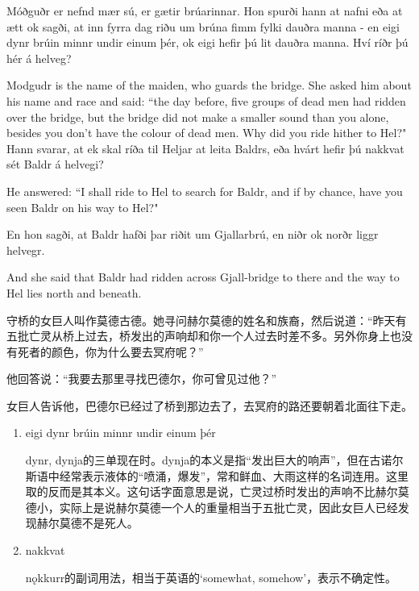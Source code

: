 \begin{paracol}{2}
    Móðguðr er nefnd mær sú, er gætir brúarinnar. Hon spurði hann at nafni eða at ætt ok sagði, at inn fyrra dag riðu um brúna fimm fylki dauðra manna - en eigi dynr brúin minnr undir einum þér, ok eigi hefir þú lit dauðra manna. Hví ríðr þú hér á helveg?
    \switchcolumn

    Modgudr is the name of the maiden, who guards the bridge. She asked him about his name and race and said: ``the day before, five groups of dead men had ridden over the bridge, but the bridge did not make a smaller sound than you alone, besides you don't have the colour of dead men. Why did you ride hither to Hel?"
    \switchcolumn*
    Hann svarar, at ek skal ríða til Heljar at leita Baldrs, eða hvárt hefir þú nakkvat sét Baldr á helvegi?

    \switchcolumn

    He answered: ``I shall ride to Hel to search for Baldr, and if by chance, have you seen Baldr on his way to Hel?"

    \switchcolumn*
    En hon sagði, at Baldr hafði þar riðit um Gjallarbrú, en niðr ok norðr liggr helvegr.

    \switchcolumn
    And she said that Baldr had ridden across Gjall-bridge to there and the way to Hel lies north and beneath.
\end{paracol}
\begin{translation*}{}
    守桥的女巨人叫作莫德古德。她寻问赫尔莫德的姓名和族裔，然后说道：“昨天有五批亡灵从桥上过去，桥发出的声响却和你一个人过去时差不多。另外你身上也没有死者的颜色，你为什么要去冥府呢？”

    他回答说：“我要去那里寻找巴德尔，你可曾见过他？”

    女巨人告诉他，巴德尔已经过了桥到那边去了，去冥府的路还要朝着北面往下走。
\end{translation*}
\begin{grammar*}{}
    \begin{enumerate}[leftmargin=*]
        \item eigi dynr brúin minnr undir einum þér

              dynr, dynja的三单现在时。dynja的本义是指“发出巨大的响声”，但在古诺尔斯语中经常表示液体的“喷涌，爆发”，常和鲜血、大雨这样的名词连用。这里取的反而是其本义。这句话字面意思是说，亡灵过桥时发出的声响不比赫尔莫德小，实际上是说赫尔莫德一个人的重量相当于五批亡灵，因此女巨人已经发现赫尔莫德不是死人。

        \item nakkvat

              nǫkkurr的副词用法，相当于英语的`somewhat, somehow'，表示不确定性。
    \end{enumerate}
\end{grammar*}
